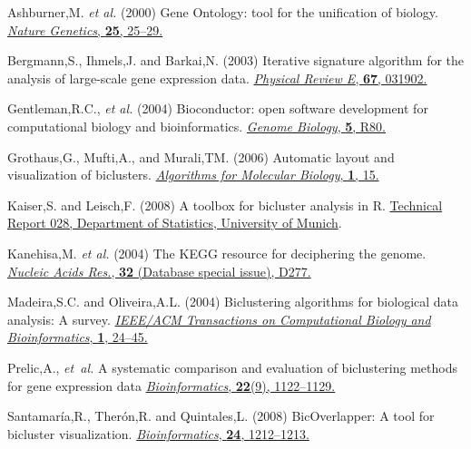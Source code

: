 \documentclass[round]{bioinfo}
\begin{document}
\begin{thebibliography}{6}

Ashburner,M. \emph{et al.} (2000)
Gene Ontology: tool for the unification of biology.
\href{http://dx.doi.org/10.1038/75556}{\emph{Nature Genetics}, {\bf 25}, 25--29.}

Bergmann,S., Ihmels,J. and Barkai,N. (2003)
Iterative signature algorithm for the analysis of large-scale gene expression data.
\href{http://dx.doi.org/10.1103/PhysRevE.67.031902 }{\emph{Physical Review E}, {\bf 67}, 031902.}


Gentleman,R.C., \emph{et al.} (2004)
Bioconductor: open software development for computational biology and bioinformatics.
\href{http://dx.doi.org/10.1186/gb-2004-5-10-r80}{\emph{Genome Biology}, {\bf 5}, R80.}

Grothaus,G., Mufti,A., and Murali,TM. (2006)
Automatic layout and visualization of biclusters.
\href{http://dx.doi.org/10.1186/1748-7188-1-15}{\emph{Algorithms for Molecular Biology}, {\bf 1}, 15.}

Kaiser,S. and Leisch,F. (2008)
A toolbox for bicluster analysis in R.
\href{http://epub.ub.uni-muenchen.de/3293/}{Technical Report 028, Department of Statistics, University of Munich}.

Kanehisa,M. \emph{et al.} (2004)
The KEGG resource for deciphering the genome.
\href{http://dx.doi.org/10.1093/nar/gkh063}{\emph{Nucleic Acids Res.}, {\bf 32} (Database special issue), D277.}

Madeira,S.C. and Oliveira,A.L. (2004)
Biclustering algorithms for biological data analysis: A survey.
\href{http://dx.doi.org/10.1109/TCBB.2004.2}{\emph{IEEE/ACM Transactions on Computational Biology and Bioinformatics}, {\bf 1}, 24--45.}

Prelic,A., \emph{et~al.} 
A systematic comparison and evaluation of biclustering methods for gene expression data 
\href{http://dx.doi.org/10.1093/bioinformatics/bt1060}{\emph{Bioinformatics}, {\bf 22}(9), 1122--1129.}

Santamar\'ia,R., Ther\'on,R. and Quintales,L. (2008)
BicOverlapper: A tool for bicluster visualization. 
\href{http://dx.doi.org/10.1093/bioinformatics/btn076}{\emph{Bioinformatics}, {\bf 24}, 1212--1213.}

\end{thebibliography}
\end{document}
